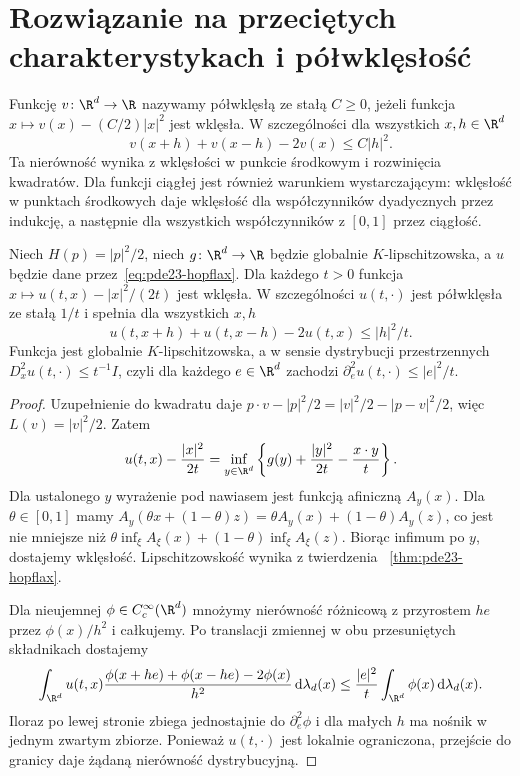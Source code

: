 \section{Rozwiązanie na przeciętych charakterystykach i półwklęsłość}
\begin{definicja}
Funkcję $v\colon\R^d\to\R$ nazywamy półwklęsłą
ze stałą $C\ge0$, jeżeli funkcja
$x\mapsto v(x)-(C/2)|x|^2$ jest wklęsła.
W szczególności dla wszystkich $x,h\in\R^d$
\[
 v(x+h)+v(x-h)-2v(x)\le C|h|^2.
\]
Ta nierówność wynika z wklęsłości w punkcie
środkowym i rozwinięcia kwadratów. Dla funkcji
ciągłej jest również warunkiem wystarczającym:
wklęsłość w punktach środkowych daje wklęsłość
dla współczynników dyadycznych przez indukcję,
a następnie dla wszystkich współczynników
z $[0,1]$ przez ciągłość.
\end{definicja}

\begin{twierdzenie}
\label{thm:pde23-semiconcave}
Niech $H(p)=|p|^2/2$, niech $g\colon\R^d\to\R$
będzie globalnie $K$-lipschitzowska, a $u$ będzie
dane przez~\eqref{eq:pde23-hopflax}. Dla każdego $t>0$
funkcja $x\mapsto u(t,x)-|x|^2/(2t)$ jest wklęsła.
W szczególności $u(t,\cdot)$ jest półwklęsła
ze stałą $1/t$ i spełnia dla wszystkich $x,h$
\[
 u(t,x+h)+u(t,x-h)-2u(t,x)\le |h|^2/t.
\]
Funkcja jest globalnie $K$-lipschitzowska,
a w sensie dystrybucji przestrzennych
$D_x^2u(t,\cdot)\le t^{-1}I$, czyli dla każdego
$e\in\R^d$ zachodzi
$\partial_e^2u(t,\cdot)\le |e|^2/t$.
\end{twierdzenie}
\begin{proof}
Uzupełnienie do kwadratu daje
$p\cdot v-|p|^2/2=|v|^2/2-|p-v|^2/2$,
więc $L(v)=|v|^2/2$. Zatem
\[
 u(t,x)-\frac{|x|^2}{2t}
 =\inf_{y\in\R^d}\left\{
 g(y)+\frac{|y|^2}{2t}-\frac{x\cdot y}{t}\right\}.
\]
Dla ustalonego $y$ wyrażenie pod nawiasem jest
funkcją afiniczną $A_y(x)$. Dla $\theta\in[0,1]$
mamy
$A_y(\theta x+(1-\theta)z)=\theta A_y(x)+(1-\theta)A_y(z)$,
co jest nie mniejsze niż
$\theta\inf_\xi A_\xi(x)+(1-\theta)\inf_\xi A_\xi(z)$.
Biorąc infimum po $y$, dostajemy wklęsłość.
Lipschitzowskość wynika z twierdzenia
~\ref{thm:pde23-hopflax}.

Dla nieujemnej $\phi\in C_c^\infty(\R^d)$
mnożymy nierówność różnicową z przyrostem $he$ przez
$\phi(x)/h^2$ i całkujemy. Po translacji zmiennej
w obu przesuniętych składnikach dostajemy
\[
 \int_{\R^d}u(t,x)
 \frac{\phi(x+he)+\phi(x-he)-2\phi(x)}{h^2}
 \,\mathrm d\lambda_d(x)
 \le\frac{|e|^2}{t}\int_{\R^d}\phi(x)\,\mathrm d\lambda_d(x).
\]
Iloraz po lewej stronie zbiega jednostajnie
do $\partial_e^2\phi$ i dla małych $h$ ma
nośnik w jednym zwartym zbiorze. Ponieważ
$u(t,\cdot)$ jest lokalnie ograniczona,
przejście do granicy daje żądaną nierówność
dystrybucyjną.
\end{proof}

